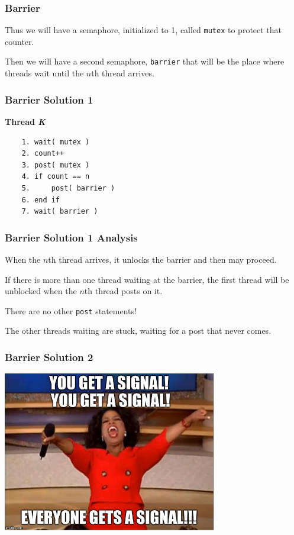 \begin{frame}
	\frametitle{Barrier}

	Thus we will have a semaphore, initialized to 1, called \texttt{mutex} to protect that counter.

	Then we will have a second semaphore, \texttt{barrier} that will be the place where threads wait until the $n$th thread arrives.


\end{frame}

\begin{frame}[fragile]
	\frametitle{Barrier Solution 1}

	\textbf{Thread \textit{K}}\vspace{-10em}
	\begin{verbatim}
	1. wait( mutex )
	2. count++
	3. post( mutex )
	4. if count == n
	5.     post( barrier )
	6. end if
	7. wait( barrier )
  \end{verbatim}
	\vspace{-2em}


\end{frame}

\begin{frame}
	\frametitle{Barrier Solution 1 Analysis}

	When the $n$th thread arrives, it unlocks the barrier and then may proceed.

	If there is more than one thread waiting at the barrier, the first thread will be unblocked when the $n$th thread posts on it.

	There are no other \texttt{post} statements!

	The other threads waiting are stuck, waiting for a post that never comes.


\end{frame}


\begin{frame}
	\frametitle{Barrier Solution 2}

	\begin{center}
		\includegraphics[width=0.7\textwidth]{images/oprah.jpg}
	\end{center}


\end{frame}


